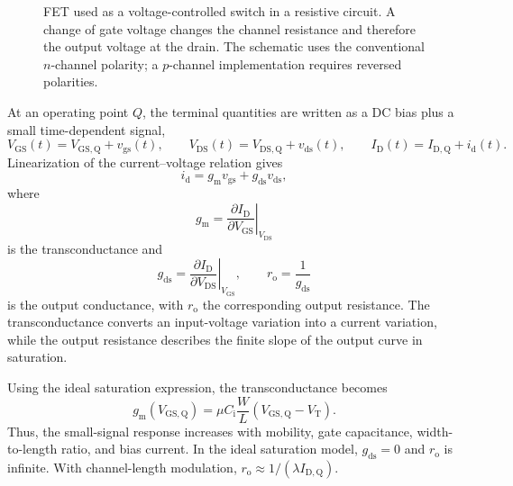 \begin{figure}[htbp]
    \centering
    \resizebox{0.35\textwidth}{!}{}
    \caption[FET used as a voltage-controlled switch]{FET used as a
    voltage-controlled switch in a resistive circuit. A change of gate voltage
    changes the channel resistance and therefore the output voltage at the drain.
    The schematic uses the conventional $n$-channel polarity; a $p$-channel
    implementation requires reversed polarities.}
    \label{fig:fet_switch}
\end{figure}

At an operating point $Q$, the terminal quantities are written as a DC bias plus
a small time-dependent signal,
\begin{equation}
    V_\mathrm{GS}(t)=V_\mathrm{GS,Q}+v_\mathrm{gs}(t),
    \qquad
    V_\mathrm{DS}(t)=V_\mathrm{DS,Q}+v_\mathrm{ds}(t),
    \qquad
    I_\mathrm{D}(t)=I_\mathrm{D,Q}+i_\mathrm{d}(t).
    \label{eq:fet_small_signal_decomposition}
\end{equation}
Linearization of the current--voltage relation gives
\begin{equation}
    i_\mathrm{d}
    = g_\mathrm{m}v_\mathrm{gs}+g_\mathrm{ds}v_\mathrm{ds},
    \label{eq:fet_small_signal_current}
\end{equation}
where
\begin{equation}
    g_\mathrm{m}
    = \left.\frac{\partial I_\mathrm{D}}{\partial V_\mathrm{GS}}
      \right|_{V_\mathrm{DS}}
    \label{eq:fet_transconductance_definition}
\end{equation}
is the transconductance and
\begin{equation}
    g_\mathrm{ds}
    = \left.\frac{\partial I_\mathrm{D}}{\partial V_\mathrm{DS}}
      \right|_{V_\mathrm{GS}},
    \qquad
    r_\mathrm{o}=\frac{1}{g_\mathrm{ds}}
    \label{eq:fet_output_conductance}
\end{equation}
is the output conductance, with $r_\mathrm{o}$ the corresponding output
resistance. The transconductance converts an input-voltage variation into a
current variation, while the output resistance describes the finite slope of the
output curve in saturation.

Using the ideal saturation expression, the transconductance becomes
\begin{equation}
    g_\mathrm{m}(V_\mathrm{GS,Q})
    = \mu C_\mathrm{i}\frac{W}{L}
      \left(V_\mathrm{GS,Q}-V_\mathrm{T}\right).
    \label{eq:fet_gm_saturation}
\end{equation}
Thus, the small-signal response increases with mobility, gate capacitance,
width-to-length ratio, and bias current. In the ideal saturation model,
$g_\mathrm{ds}=0$ and $r_\mathrm{o}$ is infinite. With channel-length modulation,
$r_\mathrm{o}\approx 1/(\lambda I_\mathrm{D,Q})$.

